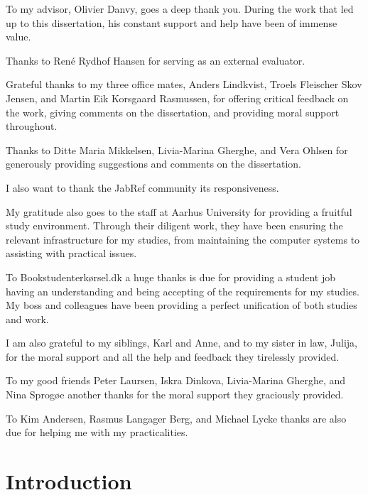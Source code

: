\documentclass[twoside,11pt,openright,a4paper]{report}
\begin{document}

To my advisor, Olivier Danvy, goes a deep thank you.  During the work
that led up to this dissertation, his constant support and help have
been of immense value.

Thanks to René Rydhof Hansen for serving as an external evaluator.

Grateful thanks to my three office mates, Anders Lindkvist, Troels
Fleischer Skov Jensen, and Martin Eik Korsgaard Rasmussen, for
offering critical feedback on the work, giving comments on the
dissertation, and providing moral support throughout.

Thanks to Ditte Maria Mikkelsen, Livia-Marina Gherghe, and Vera Ohlsen
for generously providing suggestions and comments on the dissertation.

I also want to thank the JabRef community its responsiveness.

My gratitude also goes to the staff at Aarhus University for providing
a fruitful study environment.  Through their diligent work, they have
been ensuring the relevant infrastructure for my studies, from
maintaining the computer systems to assisting with practical issues.

To Bookstudenterkørsel.dk a huge thanks is due for providing a student
job having an understanding and being accepting of the requirements
for my studies.  My boss and colleagues have been providing a perfect
unification of both studies and work.

I am also grateful to my siblings, Karl and Anne, and to my sister in
law, Julija, for the moral support and all the help and feedback they
tirelessly provided.

To my good friends Peter Laursen, Iskra Dinkova, Livia-Marina
Gherghe, and Nina Sprogøe another thanks for the moral support they
graciously provided.

To Kim Andersen, Rasmus Langager Berg, and Michael Lycke thanks are
also due for helping me with my practicalities.


\tableofcontents
\newpage

\setcounter{secnumdepth}{2}


\chapter{Introduction}
\label{ch:intro}

\end{document}
